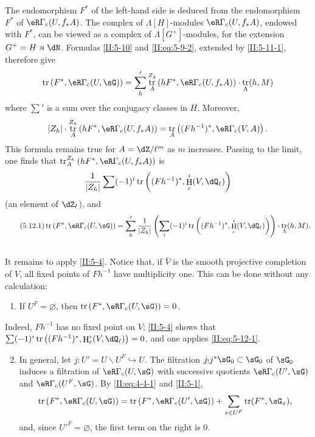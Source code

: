 \documentclass[12pt,oneside,english]{smfbook}
\DeclareMathOperator{\h}{H}
\DeclareMathOperator{\tr}{tr}
\renewcommand{\setminus}{\smallsetminus}
\begin{document}
The endomorphism $F^*$ of the left-hand side is deduced from the endomorphism $F^*$ of $\eR\Gamma_c(U,f_*A)$. The complex of $\Lambda[H]$-modules $\eR\Gamma_c(U,f_*A)$, endowed with $F^*$, can be viewed as a complex of $\Lambda[G^+]$-modules, for the extension $G^+=H\rtimes\dN$. Formulas \ref{II:5-10} and \eqref{II:eq:5-9-2}, extended by \ref{II:5-11-1}, therefore give
\[
  \tr\left(F^*,\eR\Gamma_c(U,\sG)\right) = \sum_h' \tr_A^{Z_g}\left(h F^*,\eR\Gamma_c(U,f_* A)\right)\cdot \tr_\Lambda(h,M)
\]
where $\sum'$ is a sum over the conjugacy classes in $H$. Moreover,
\[
  |Z_h|\cdot \tr_A^{Z_h}\left(h F^*,\eR\Gamma_c(U,f_*A)\right) = \tr_A\left((F h^{-1})^*,\eR\Gamma_c(V,A)\right) \text{.}
\]
This formula remains true for $A=\dZ/\ell^m$ as $m$ increases. Passing to the limit, one finds that $\tr_A^{Z_h}\left(hF^*,\eR\Gamma_c(U,f_*A)\right)$ is
\[
  \frac{1}{|Z_h|} \sum (-1)^i \tr\left((F h^{-1})^*,\h_c^i(V,\dQ_\ell)\right)
\]
(an element of $\dZ_\ell$), and
\begin{equation*}\tag{5.12.1}\label{II:eq:5-12-1}
\tr\left(F^*,\eR\Gamma_c(U,\sG)\right) = \sum_h' \frac{1}{|Z_h|}
  \left(\sum_i(-1)^i\tr\left((F h^{-1})^*,\h_c^i(V,\dQ_\ell)\right)\right)
  \cdot \tr_\Lambda(h,M) \text{.}
\end{equation*}

\subsection{}\label{II:5-13}

It remains to apply \ref{II:5-4}. Notice that, if $\bar V$ is the smooth projective completion of $V$, all fixed points of $Fh^{-1}$ have multiplicity one. This can be done without any calculation:
\begin{enumerate}[\indent A.]
  \item If $U^F=\varnothing$, then $\tr\left(F^*,\eR\Gamma_c(U,\sG)\right)=0$.
\end{enumerate}

Indeed, $Fh^{-1}$ has no fixed point on $V$; \ref{II:5-4} shows that $\sum(-1)^i\tr\left((Fh^{-1})^*,\h_c^i(V,\dQ_\ell)\right)=0$, and one applies \eqref{II:eq:5-12-1}.
\begin{enumerate}[\indent A.]
\setcounter{enumi}{1}
  \item In general, let $j:U'=U\setminus U^F\hookrightarrow U$. The filtration $j_!j^*\sG_0\subset\sG_0$ of $\sG_0$ induces a filtration of $\eR\Gamma_c(U,\sG)$ with successive quotients $\eR\Gamma_c(U',\sG)$ and $\eR\Gamma_c(U^F,\sG)$. By \eqref{II:eq:4-4-1} and \ref{II:5-1},
    \[
      \tr\left(F^*,\eR\Gamma_c(U,\sG)\right) = \tr\left(F^*,\eR\Gamma_c(U',\sG)\right) + \sum_{x\in U^F} \tr(F^*,\sG_x) \text{,}
    \]
    and, since ${U'}^F=\varnothing$, the first term on the right is $0$.
\end{enumerate}
\end{document}
